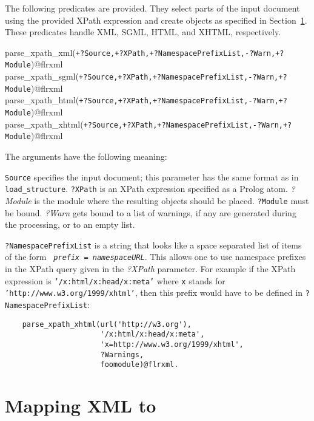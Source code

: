 The following predicates are provided. They select parts of the input
document using the provided XPath expression and create \FLSYSTEM objects as
specified in Section~\ref{xml-to-flora}. These predicates handle XML, SGML,
HTML, and XHTML, respectively.

\begin{description}
\item[parse\_xpath\_xml({\tt +?Source,+?XPath,+?NamespacePrefixList,-?Warn,+?Module})@flrxml]
\item[parse\_xpath\_sgml({\tt +?Source,+?XPath,+?NamespacePrefixList,-?Warn,+?Module})@flrxml]
\item[parse\_xpath\_html({\tt +?Source,+?XPath,+?NamespacePrefixList,-?Warn,+?Module})@flrxml]
\item[parse\_xpath\_xhtml({\tt +?Source,+?XPath,+?NamespacePrefixList,-?Warn,+?Module})@flrxml]
\end{description}
The arguments have the following meaning:

{\tt Source} specifies the input document; this parameter has the same
format as in {\tt load\_structure}. {\tt ?XPath} is an XPath expression
specified as a Prolog atom. \emph{?Module} is the module where the resulting
\FLSYSTEM objects should be placed. {\tt ?Module} must be bound. \emph{?Warn}
gets bound to a list of warnings, if any are generated during the
processing, or to an empty list.

{\tt ?NamespacePrefixList} is a string that looks like a
space separated list of items of the form {\tt
  \emph{prefix} = \emph{namespaceURL}}. This allows one to use namespace
prefixes in the
XPath query given in the \emph{?XPath} parameter.
For example if the XPath expression is {\tt '/x:html/x:head/x:meta'}
where {\tt x} 
stands for {\tt 'http://www.w3.org/1999/xhtml'}, then this
prefix would have to be
defined in {\tt ?NamespacePrefixList}:

\begin{verbatim}	
    parse_xpath_xhtml(url('http://w3.org'),
                      '/x:html/x:head/x:meta',
                      'x=http://www.w3.org/1999/xhtml',
                      ?Warnings,
                      foomodule)@flrxml.
\end{verbatim}



\section{Mapping XML to \FLSYSTEM}\label{xml-to-flora}

